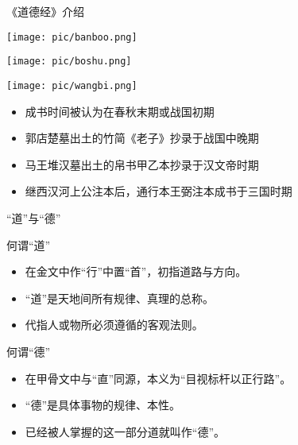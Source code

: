 \documentclass{beamer}
\begin{document}
\begin{frame}{《道德经》介绍}
		\begin{minipage}{0.3\textwidth}
			\centering
  			\texttt{[image: pic/banboo.png]}
		\end{minipage}
		\hfill
		\begin{minipage}{0.3\textwidth}
			\centering
			\texttt{[image: pic/boshu.png]}
		\end{minipage}
		\hfill
		\begin{minipage}{0.3\textwidth}
			\centering
			\texttt{[image: pic/wangbi.png]}
		\end{minipage}
		

	\begin{itemize}
		\item 成书时间被认为在春秋末期或战国初期 %
		\item 郭店楚墓出土的\alert{竹简《老子》}抄录于战国中晚期 %
		\item 马王堆汉墓出土的\alert{帛书甲乙本}抄录于汉文帝时期 %
		\item 继西汉河上公注本后，通行本\alert{王弼注本}成书于三国时期 %
	\end{itemize}
\end{frame}

\begin{frame}{“道”与“德”}
    \begin{block}{何谓“道”}
    	\begin{itemize}
    		\item 在金文中作“行”中置“首”，初指道路与方向。
			\item “道”是天地间所有\alert{规律、真理}的总称。
			\item 代指人或物所必须遵循的客观法则。
		\end{itemize}
    \end{block}
    \vfill
    
    \begin{block}{何谓“德”}
		\begin{itemize}
			\item 在甲骨文中与“直”同源，本义为“目视标杆以正行路”。
			\item “德”是\alert{具体事物}的规律、本性。
			\item 已经被人掌握的这一部分道就叫作“德”。
		\end{itemize}
    \end{block}
    \vfill
\end{frame}
\end{document}
